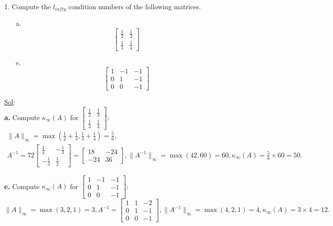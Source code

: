 \begin{enumerate}
  \item[1.] Compute the \(l_{infty}\) condition numbers of the
    following matrices.
    \begin{enumerate}
      \item[a.] \[
          \begin{bmatrix}
            \frac{1}{2} & \frac{1}{3} \\
            \frac{1}{3} & \frac{1}{4}
          \end{bmatrix}
        \]
      \item[e.] \[
          \begin{bmatrix}
            1 & -1 & -1 \\
            0 & 1 & -1 \\
            0 & 0 & -1
          \end{bmatrix}
        \]
    \end{enumerate}

    \underline{Sol}:\\
    \textbf{a.} Compute \(\kappa_\infty(A)\) for \(
      \begin{bmatrix} \frac{1}{2} & \frac{1}{3} \\ \frac{1}{3} & \frac{1}{4}
    \end{bmatrix}\):
    \[
      \begin{array}{l}
        \|A\|_\infty = \max\left(\frac{1}{2} + \frac{1}{3},
        \frac{1}{3} + \frac{1}{4}\right) = \frac{5}{6},  \\
        A^{-1} = 72
        \begin{bmatrix} \frac{1}{4} & -\frac{1}{3} \\ -\frac{1}{3} &
          \frac{1}{2}
        \end{bmatrix} =
        \begin{bmatrix} 18 & -24 \\ -24 & 36
        \end{bmatrix},
        \|A^{-1}\|_\infty = \max(42, 60) = 60,
        \kappa_\infty(A) = \frac{5}{6} \times 60 = \boxed{50}.
      \end{array}
    \]

    \textbf{e.} Compute \(\kappa_\infty(A)\) for \(
      \begin{bmatrix} 1 & -1 & -1 \\ 0 & 1 & -1 \\ 0 & 0 & -1
    \end{bmatrix}\):
    \[
      \|A\|_\infty = \max(3, 2, 1) = 3,
      A^{-1} =
      \begin{bmatrix} 1 & 1 & -2 \\ 0 & 1 & -1 \\ 0 & 0 & -1
      \end{bmatrix},
      \|A^{-1}\|_\infty = \max(4, 2, 1) = 4,
      \kappa_\infty(A) = 3 \times 4 = \boxed{12}.
    \]


\end{enumerate}
